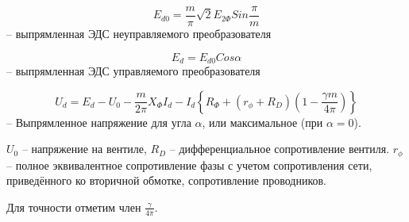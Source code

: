 
\begin{equation}
E_{d0} = \frac{m}{\pi}\sqrt{2} E_{2\Phi} Sin\frac{\pi}{m}
\end{equation}
-- выпрямленная ЭДС неуправляемого преобразователя

\begin{equation}
E_d = E_{d0} Cos \alpha
\end{equation}
-- выпрямленная ЭДС управляемого преобразователя

\begin{equation}
U_d = E_{d} - U_0 - \frac{m}{2\pi} X_\Phi I_d - I_d \left\{
R_\Phi + \left(r_\phi + R_D\right) \left( 1 - \frac{\gamma m}{4 \pi}\right) 
\right\}
\label{three}
\end{equation}
-- Выпрямленное напряжение для угла $\alpha$, или максимальное (при $\alpha=0$).

$U_0$ -- напряжение на вентиле, $R_D$ -- дифференциальное сопротивление вентиля.
$r_\phi$ -- полное эквивалентное сопротивление фазы с учетом сопротивления сети,
приведённого ко вторичной обмотке, сопротивление проводников.

Для точности отметим член ${\displaystyle \frac{\gamma}{4\pi}}$.

